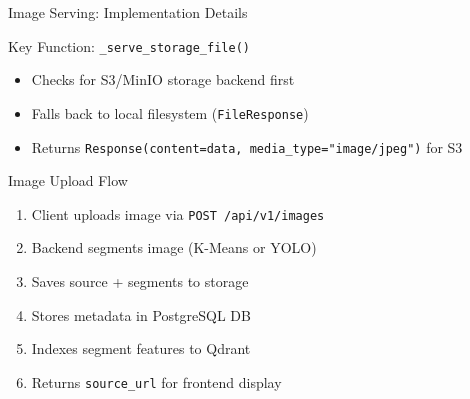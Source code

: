 \documentclass[aspectratio=169,11pt]{beamer}
\begin{document}
\begin{frame}{Image Serving: Implementation Details}
  \begin{block}{Key Function: \texttt{\_serve\_storage\_file()}}
    \begin{itemize}
      \item Checks for S3/MinIO storage backend first
      \item Falls back to local filesystem (\texttt{FileResponse})
      \item Returns \texttt{Response(content=data, media\_type="image/jpeg")} for S3
    \end{itemize}
  \end{block}

  \begin{block}{Image Upload Flow}
    \begin{enumerate}
      \item Client uploads image via \texttt{POST /api/v1/images}
      \item Backend segments image (K-Means or YOLO)
      \item Saves source + segments to storage
      \item Stores metadata in PostgreSQL DB
      \item Indexes segment features to Qdrant
      \item Returns \texttt{source\_url} for frontend display
    \end{enumerate}
  \end{block}
\end{frame}
\end{document}
